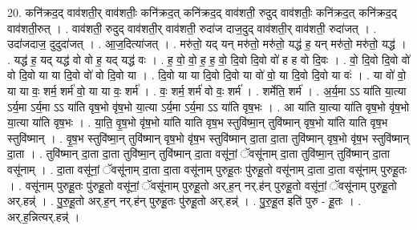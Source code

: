 \documentclass[17pt]{extarticle}
\begin{document}
20. कनि॑क्रद॒द् वाव॑शती॒र् वाव॑शतीः॒ कनि॑क्रद॒त् कनि॑क्रद॒द् वाव॑शती॒ रुदुद् वाव॑शतीः॒ कनि॑क्रद॒त् कनि॑क्रद॒द् वाव॑शती॒रुत् । . वाव॑शती॒ रुदुद् वाव॑शती॒र् वाव॑शती॒ रुदा॑ज दाज॒दुद् वाव॑शती॒र् वाव॑शती॒ रुदा॑जत् । . उदा॑जदाज॒ दुदुदा॑जत् । . आ॒ज॒दित्या॑जत् । . मरु॑तो॒ यद् यन् मरु॑तो॒ मरु॑तो॒ यद्ध॑ ह॒ यन् मरु॑तो॒ मरु॑तो॒ यद्ध॑ । . यद्ध॑ ह॒ यद् यद्ध॑ वो वो ह॒ यद् यद्ध॑ वः । . ह॒ वो॒ वो॒ ह॒ ह॒ वो॒ दि॒वो दि॒वो वो॑ ह ह वो दि॒वः । . वो॒ दि॒वो दि॒वो वो॑ वो दि॒वो या या दि॒वो वो॑ वो दि॒वो या । . दि॒वो या या दि॒वो दि॒वो या वो॑ वो॒ या दि॒वो दि॒वो या वः॑ । . या वो॑ वो॒ या या वः॒ शर्म॒ शर्म॑ वो॒ या या वः॒ शर्म॑ । . वः॒ शर्म॒ शर्म॑ वो वः॒ शर्म॑ । . शर्मेति॒ शर्म॑ । . अ॒र्य॒मा ऽऽ या॑ति या॒त्या ऽर्य॒मा ऽर्य॒मा ऽऽ या॑ति वृष॒भो वृ॑ष॒भो या॒त्या ऽर्य॒मा ऽर्य॒मा ऽऽ या॑ति वृष॒भः । . आ या॑ति या॒त्या या॑ति वृष॒भो वृ॑ष॒भो या॒त्या या॑ति वृष॒भः । . या॒ति॒ वृ॒ष॒भो वृ॑ष॒भो या॑ति याति वृष॒भ स्तुवि॑ष्मा॒न् तुवि॑ष्मान् वृष॒भो या॑ति याति वृष॒भ स्तुवि॑ष्मान् । . वृ॒ष॒भ स्तुवि॑ष्मा॒न् तुवि॑ष्मान् वृष॒भो वृ॑ष॒भ स्तुवि॑ष्मान् दा॒ता दा॒ता तुवि॑ष्मान् वृष॒भो वृ॑ष॒भ स्तुवि॑ष्मान् दा॒ता । . तुवि॑ष्मान् दा॒ता दा॒ता तुवि॑ष्मा॒न् तुवि॑ष्मान् दा॒ता वसू॑नां॒ ॅवसू॑नाम् दा॒ता तुवि॑ष्मा॒न् तुवि॑ष्मान् दा॒ता वसू॑नाम् । . दा॒ता वसू॑नां॒ ॅवसू॑नाम् दा॒ता दा॒ता वसू॑नाम् पुरुहू॒तः पु॑रुहू॒तो वसू॑नाम् दा॒ता दा॒ता वसू॑नाम् पुरुहू॒तः । . वसू॑नाम् पुरुहू॒तः पु॑रुहू॒तो वसू॑नां॒ ॅवसू॑नाम् पुरुहू॒तो अर्.ह॒न् नर्.ह॑न् पुरुहू॒तो वसू॑नां॒ ॅवसू॑नाम् 
पुरुहू॒तो अर्.हन्न्॑ । . पु॒रु॒हू॒तो अर्.ह॒न् नर्.ह॑न् पुरुहू॒तः पु॑रुहू॒तो अर्.हन्न्॑ । . पु॒रु॒हू॒त इति॑ पुरु - हू॒तः । . अर्.ह॒न्नित्यर्.हन्न्॑ । \newline
\end{document}
